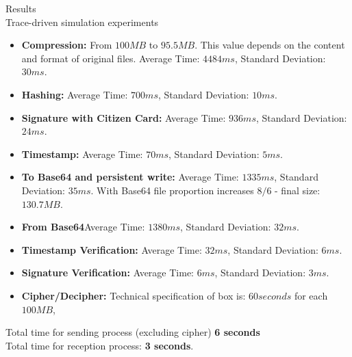 \begin{frame}{Results \\ \small Trace-driven simulation experiments}


\begin{itemize}
\item \textbf{Compression: } From $100MB$ to $95.5MB$. This value depends on the content and format of original files. Average Time: $4484ms$, Standard Deviation: $30ms$. 
\item \textbf{Hashing: } Average Time: $700ms$,  Standard Deviation: $10ms$.
\item \textbf{Signature with Citizen Card:} Average Time: $936ms$, Standard Deviation: $24ms$. 
\item \textbf{Timestamp: } Average Time: $70ms$, Standard Deviation: $5ms$.
\item \textbf{To Base64 and persistent write: }Average Time: $1335ms$, Standard Deviation: $35ms$. With Base64 file proportion increases $8/6$ - final size: $130.7MB$.
\item  \textbf{From Base64}Average Time: $1380ms$, Standard Deviation: $32ms$.
\item \textbf{Timestamp Verification: } Average Time: $32ms$, Standard Deviation: $6ms$.
\item  \textbf{Signature Verification: } Average Time: $6ms$, Standard Deviation: $3ms$.
\item \textbf{Cipher/Decipher: } Technical specification of box is: $60 seconds$ for each $100MB$, 
\end{itemize}

Total time for sending process (excluding cipher) \textbf{6 seconds}\\
Total time for reception process: \textbf{3 seconds}. \\


\end{frame}

